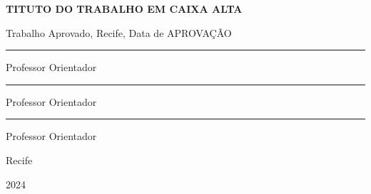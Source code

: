 \vspace*{\fill} 
\begin{center}

    \vspace{10cm}
    
    \textbf{TITUTO DO TRABALHO EM CAIXA ALTA}

    Trabalho Aprovado, Recife, Data de APROVAÇÃO

    \hspace{3cm}


    \rule{12cm}{0.2mm}

    Professor Orientador

    \hspace{3cm}

    \rule{12cm}{0.2mm}

    Professor Orientador

    \hspace{3cm}

    \rule{12cm}{0.2mm}

    Professor Orientador

    \hspace{3cm}

    
    \vfill{}

    Recife

    2024

\end{center}
\thispagestyle{empty}